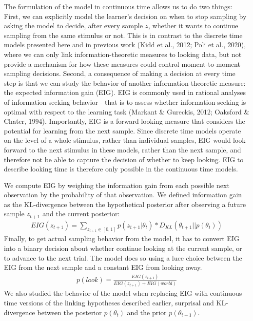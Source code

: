 \documentclass[10pt, letterpaper]{article}
\begin{document}
The formulation of the model in continuous time allows us to do two
things: First, we can explicitly model the learner's decision on when to
stop sampling by asking the model to decide, after every sample \(z\),
whether it wants to continue sampling from the same stimulus or not.
This is in contrast to the discrete time models presented here and in
previous work (Kidd et al., 2012; Poli et al., 2020), where we can only
link information-theoretic measures to looking data, but not provide a
mechanism for how these measures could control moment-to-moment sampling
decisions. Second, a consequence of making a decision at every time step
is that we can study the behavior of another information-theoretic
measure: the expected information gain (EIG). EIG is commonly used in
rational analyses of information-seeking behavior - that is to assess
whether information-seeking is optimal with respect to the learning task
(Markant \& Gureckis, 2012; Oaksford \& Chater, 1994). Importantly, EIG
is a forward-looking measure that considers the potential for learning
from the next sample. Since discrete time models operate on the level of
a whole stimulus, rather than individual samples, EIG would look forward
to the next stimulus in these models, rather than the next sample, and
therefore not be able to capture the decision of whether to keep
looking. EIG to describe looking time is therefore only possible in the
continuous time models.

We compute EIG by weighing the information gain from each possible next
observation by the probability of that observation. We defined
information gain as the KL-divergence between the hypothetical posterior
after observing a future sample \(z_{t+1}\) and the current posterior:
\begin{eqnarray}
EIG(z_{t+1}) = \sum_{z_{t+1} \in [0,1]} p(z_{t+1}|\theta_t) * D_{KL}(\theta_{t+1} || p(\theta_t))
\end{eqnarray} Finally, to get actual sampling behavior from the model,
it has to convert EIG into a binary decision about whether continue
looking at the current sample, or to advance to the next trial. The
model does so using a luce choice between the EIG from the next sample
and a constant EIG from looking away. \begin{eqnarray}
p(look) = \frac{EIG(z_{t+1})}{EIG(z_{t+1})+EIG(world)}
\end{eqnarray} We also studied the behavior of the model when replacing
EIG with continuous time versions of the linking hypotheses described
earlier, surprisal and KL-divergence between the posterior
\(p(\theta_t)\) and the prior \(p(\theta_{t-1})\).
\end{document}
